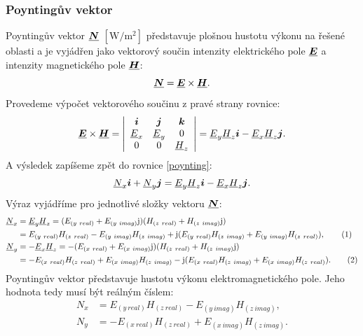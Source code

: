\documentclass[12pt,a4paper,oneside]{article}
\numberwithin{equation}{section} %
\numberwithin{figure}{section} %
\numberwithin{table}{section} %
\newcommand{\mj}{\mathrm{j}} %
\renewcommand{\vec}[1]{\mbox{\boldmath$#1$}} %
\newcommand{\faz}[1]{{\underline{#1}}} %
\newcommand\numberthis{\addtocounter{equation}{1}\tag{\theequation}}
\begin{document}
\subsubsection{Poyntingův vektor}
Poyntingův vektor $\faz{\vec{N}}$ $\mathrm{[W / m ^2]}$ představuje plošnou hustotu výkonu na řešené oblasti a je vyjádřen jako vektorový součin intenzity elektrického pole $\faz{\vec{E}}$ a intenzity magnetického pole $\faz{\vec{H}}$:
\begin{equation}
\label{poynting}
\faz{\vec{N}} = \faz{\vec{E}} \times \faz{\vec{H}} .
\end{equation}
Provedeme výpočet vektorového součinu z pravé strany rovnice:
\begin{equation}
\faz{\vec{E}} \times \faz{\vec{H}} =
\left| 
\begin{array}{c c c}
\vec{i} & \vec{j} & \vec{k} \\ 
\faz{E} _x & \faz{E} _y & 0 \\
0 & 0 & \faz{H} _z
\end{array}
\right|
= \faz{E} _y \faz{H} _z \vec{i} - \faz{E} _x \faz{H} _z \vec{j} .
\end{equation}
A výsledek zapíšeme zpět do rovnice \ref{poynting}:
\begin{equation}
\faz{N} _x \vec{i} + \faz{N} _y \vec{j} = \faz{E} _y \faz{H} _z \vec{i} - \faz{E} _x \faz{H} _z \vec{j} .
\end{equation}
Výraz vyjádříme pro jednotlivé složky vektoru $\faz{\vec{N}}$:
\begin{subequations}
\begin{align*}
\faz{N} _x &= \faz{E} _y \faz{H} _z = (E _{(y~real)} + E _{(y~imag)} \mj) (H _{(z~real)} + H _{(z~imag)} \mj) 
\\
&= E _{(y~real)} H _{(z~real)} - E _{(y~imag)} H _{(z~imag)} + \mj (E _{(y~real)} H _{(z~imag)} + E _{(y~imag)} H _{(z~real)}) ,
\numberthis
\\
\faz{N} _y &= - \faz{E} _x \faz{H} _z = - (E _{(x~real)} + E _{(x~imag)} \mj) (H _{(z~real)} + H _{(z~imag)} \mj)
\\ 
&= - E _{(x~real)} H _{(z~real)} + E _{(x~imag)} H _{(z~imag)} - \mj (E _{(x~real)} H _{(z~imag)} + E _{(x~imag)} H _{(z~real)}) .
\numberthis
\end{align*}
\end{subequations}
Poyntingův vektor představuje hustotu výkonu elektromagnetického pole. Jeho hodnota tedy musí být reálným číslem:
\begin{subequations}
\begin{align}
N _x &= E _{(y~real)} H _{(z~real)} - E _{(y~imag)} H _{(z~imag)} ,
\\
N _y &= - E _{(x~real)} H _{(z~real)} + E _{(x~imag)} H _{(z~imag)} .
\end{align}
\end{subequations}
\end{document}
